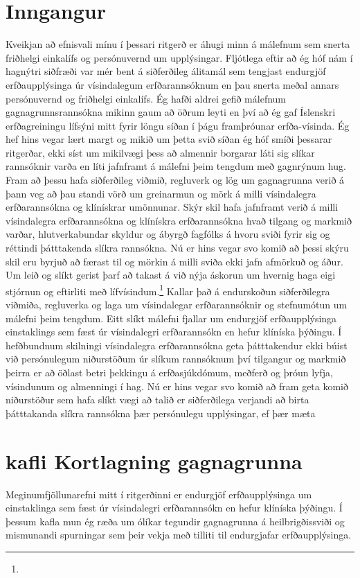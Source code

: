 \documentclass[a4paper,12pt,twoside,BCOR=10mm]{scrbook}
\begin{document}
\chapter*{Inngangur}
Kveikjan að efnisvali mínu í þessari ritgerð er áhugi minn á málefnum sem snerta friðhelgi einkalífs og persónuvernd um upplýsingar. Fljótlega eftir að ég hóf nám í hagnýtri siðfræði var mér bent á siðferðileg álitamál sem tengjast endurgjöf erfðaupplýsinga úr vísindalegum erfðarannsóknum en þau snerta meðal annars persónuvernd og friðhelgi einkalífs. Ég hafði aldrei gefið málefnum gagnagrunnsrannsókna mikinn gaum að öðrum leyti en því að ég gaf Íslenskri erfðagreiningu lífsýni mitt fyrir löngu síðan í þágu framþróunar erfða-vísinda. Ég hef hins vegar lært margt og mikið um þetta svið síðan ég hóf smíði þessarar ritgerðar, ekki síst um mikilvægi þess að almennir borgarar láti sig slíkar rannsóknir varða en líti jafnframt á málefni þeim tengdum með gagnrýnum hug.
Fram að þessu hafa siðferðileg viðmið, regluverk og lög um gagnagrunna verið á þann veg að þau standi vörð um greinarmun og mörk á milli vísindalegra erfðarannsókna og klínískrar umönnunar. Skýr skil hafa jafnframt verið á milli vísindalegra erfðarannsókna og klínískra erfðarannsókna hvað tilgang og markmið varðar, hlutverkabundar skyldur og ábyrgð fagfólks á hvoru sviði fyrir sig og réttindi þátttakenda slíkra rannsókna. Nú er hins vegar svo komið að þessi skýru skil eru byrjuð að færast til og mörkin á milli sviða ekki jafn afmörkuð og áður. Um leið og slíkt gerist þarf að takast á við nýja áskorun um hvernig haga eigi stjórnun og eftirliti með lífvísindum.\footnote{} Kallar það á endurskoðun siðferðilegra viðmiða, regluverka og laga um vísindalegar erfðarannsóknir og stefnumótun um málefni þeim tengdum.
Eitt slíkt málefni fjallar um endurgjöf erfðaupplýsinga einstaklings sem fæst úr vísindalegri erfðarannsókn en hefur klíníska þýðingu. Í hefðbundnum skilningi vísindalegra erfðarannsókna geta þátttakendur ekki búist við persónulegum niðurstöðum úr slíkum rannsóknum því tilgangur og markmið þeirra er að öðlast betri þekkingu á erfðasjúkdómum, meðferð og þróun lyfja, vísindunum og almenningi í hag.  Nú er hins vegar svo komið að fram geta komið niðurstöður sem hafa slíkt vægi að talið er siðferðilega verjandi að birta þátttakanda slíkra rannsókna þær persónulegu upplýsingar, ef þær mæta

\chapter{kafli  Kortlagning gagnagrunna}
\setcounter{page}{1}
Meginumfjöllunarefni mitt í ritgerðinni er endurgjöf erfðaupplýsinga um einstaklinga sem fæst úr vísindalegri erfðarannsókn en hefur klíníska þýðingu. Í þessum kafla mun ég ræða um ólíkar tegundir gagnagrunna á heilbrigðissviði og mismunandi spurningar sem þeir vekja með tilliti til endurgjafar erfðaupplýsinga.
\end{document}
